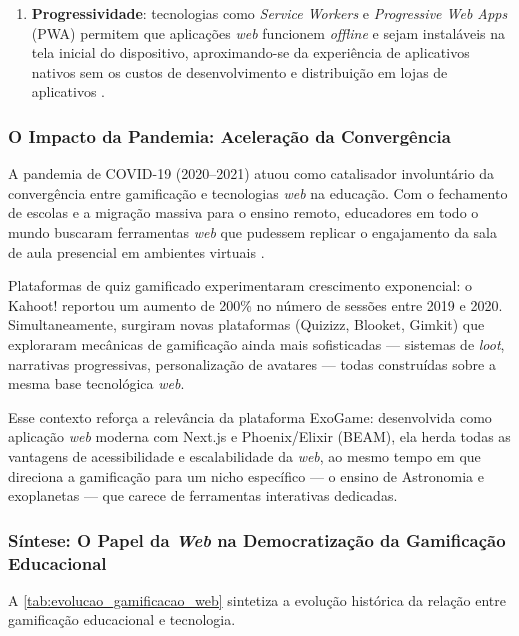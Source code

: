 \documentclass[
	12pt,
	openany,
	oneside,
	a4paper,
	english,
	brazil
]{abntex2}
\begin{document}
\begin{enumerate}
  \item \textbf{Progressividade}: tecnologias como \textit{Service Workers} e \textit{Progressive Web Apps} (PWA) permitem que aplicações \textit{web} funcionem \textit{offline} e sejam instaláveis na tela inicial do dispositivo, aproximando-se da experiência de aplicativos nativos sem os custos de desenvolvimento e distribuição em lojas de aplicativos \cite{majchrzak2018}.
\end{enumerate}

\subsubsection{O Impacto da Pandemia: Aceleração da Convergência}

A pandemia de COVID-19 (2020--2021) atuou como catalisador involuntário da convergência entre gamificação e tecnologias \textit{web} na educação. Com o fechamento de escolas e a migração massiva para o ensino remoto, educadores em todo o mundo buscaram ferramentas \textit{web} que pudessem replicar o engajamento da sala de aula presencial em ambientes virtuais \cite{dicheva2015}.

Plataformas de quiz gamificado experimentaram crescimento exponencial: o Kahoot! reportou um aumento de 200\% no número de sessões entre 2019 e 2020. Simultaneamente, surgiram novas plataformas (Quizizz, Blooket, Gimkit) que exploraram mecânicas de gamificação ainda mais sofisticadas --- sistemas de \textit{loot}, narrativas progressivas, personalização de avatares --- todas construídas sobre a mesma base tecnológica \textit{web}.

Esse contexto reforça a relevância da plataforma ExoGame: desenvolvida como aplicação \textit{web} moderna com Next.js e Phoenix/Elixir (BEAM), ela herda todas as vantagens de acessibilidade e escalabilidade da \textit{web}, ao mesmo tempo em que direciona a gamificação para um nicho específico --- o ensino de Astronomia e exoplanetas --- que carece de ferramentas interativas dedicadas.

\subsubsection{Síntese: O Papel da \textit{Web} na Democratização da Gamificação Educacional}

A \autoref{tab:evolucao_gamificacao_web} sintetiza a evolução histórica da relação entre gamificação educacional e tecnologia.
\end{document}
